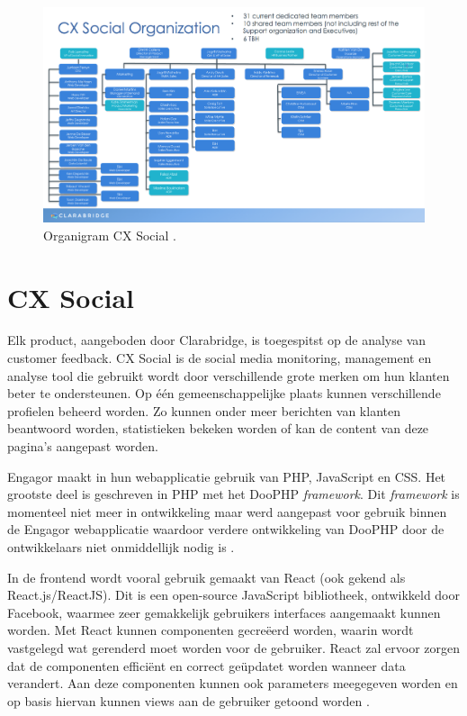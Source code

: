 \begin{figure}[H]
	\centering
	\includegraphics[width=1\textwidth]{Figuren/Organigram.png}
	\caption{Organigram CX Social .} %
	\label{fig:Organigram}
\end{figure} 


\section{CX Social}
Elk product, aangeboden door Clarabridge, is toegespitst op de analyse van customer feedback. CX Social is de social media monitoring, management en analyse tool die gebruikt wordt door verschillende grote merken om hun klanten beter te ondersteunen. Op \'{e}\'{e}n gemeenschappelijke plaats kunnen verschillende profielen beheerd worden. Zo kunnen onder meer berichten van klanten beantwoord worden, statistieken bekeken worden of kan de content van deze pagina's aangepast worden. 

Engagor maakt in hun webapplicatie gebruik van PHP, JavaScript en CSS. Het grootste deel is geschreven in PHP met het DooPHP \textit{framework}. Dit \textit{framework} is momenteel niet meer in ontwikkeling maar werd aangepast voor gebruik binnen de Engagor webapplicatie waardoor verdere ontwikkeling van DooPHP door de ontwikkelaars niet onmiddellijk nodig is \cite{DooPHP}. 

In de frontend wordt vooral gebruik gemaakt van React (ook gekend als React.js/ReactJS). Dit is een open-source JavaScript bibliotheek, ontwikkeld door Facebook, waarmee zeer gemakkelijk gebruikers interfaces aangemaakt kunnen worden. Met React kunnen componenten gecre\"{e}erd worden, waarin wordt vastgelegd wat gerenderd moet worden voor de gebruiker. React zal ervoor zorgen dat de componenten effici\"{e}nt en correct ge\"{u}pdatet worden wanneer data verandert. Aan deze componenten kunnen ook parameters meegegeven worden en op basis hiervan kunnen views aan de gebruiker getoond worden \cite{React}. 


